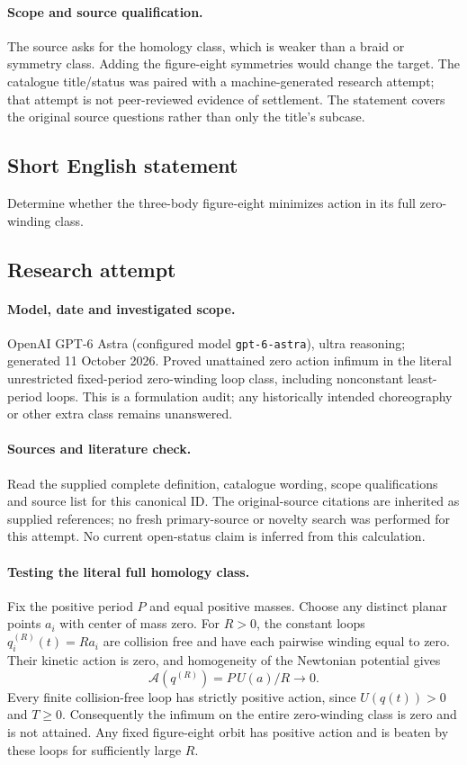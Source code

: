 \documentclass[11pt]{article}
\begin{document}
\paragraph{Scope and source qualification.}The source asks for the homology class, which is weaker than a braid or symmetry class. Adding the figure-eight symmetries would change the target. The catalogue title/status was paired with a machine-generated research attempt; that attempt is not peer-reviewed evidence of settlement. The statement covers the original source questions rather than only the title’s subcase.
\subsection{Short English statement}
Determine whether the three-body figure-eight minimizes action in its full zero-winding class.
\subsection{Research attempt}
\paragraph{Model, date and investigated scope.}
OpenAI GPT-6 Astra (configured model \texttt{gpt-6-astra}), ultra reasoning; generated 11 October 2026. Proved unattained zero action infimum in the literal unrestricted fixed-period zero-winding loop class, including nonconstant least-period loops. This is a formulation audit; any historically intended choreography or other extra class remains unanswered.

\paragraph{Sources and literature check.}
Read the supplied complete definition, catalogue wording, scope qualifications and source list for this canonical ID. The original-source citations are inherited as supplied references; no fresh primary-source or novelty search was performed for this attempt. No current open-status claim is inferred from this calculation.

\paragraph{Testing the literal full homology class.}Fix the positive period \(P\) and equal positive masses. Choose any distinct planar points \(a_i\) with center of mass zero. For \(R>0\), the constant loops \(q_i^{(R)}(t)=Ra_i\) are collision free and have each pairwise winding equal to zero. Their kinetic action is zero, and homogeneity of the Newtonian potential gives
\[\mathcal A(q^{(R)})=P\,U(a)/R\longrightarrow0.
\]
Every finite collision-free loop has strictly positive action, since \(U(q(t))>0\) and \(T\ge0\). Consequently the infimum on the entire zero-winding class is zero and is not attained. Any fixed figure-eight orbit has positive action and is beaten by these loops for sufficiently large \(R\).
\end{document}
